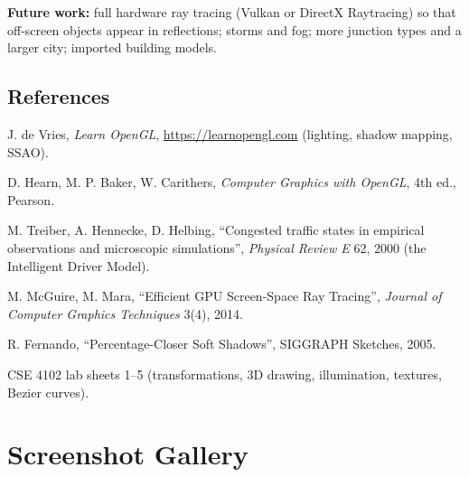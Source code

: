 \documentclass[11pt,a4paper]{article}
\begin{document}
\textbf{Future work:} full hardware ray tracing (Vulkan or DirectX Raytracing) so that off-screen objects appear in reflections; storms and fog; more junction types and a larger city; imported building models.

\subsection*{References}
\begin{enumerate}[label={[\arabic*]}]
  \item J. de Vries, \emph{Learn OpenGL}, \url{https://learnopengl.com} (lighting, shadow mapping, SSAO).
  \item D. Hearn, M. P. Baker, W. Carithers, \emph{Computer Graphics with OpenGL}, 4th ed., Pearson.
  \item M. Treiber, A. Hennecke, D. Helbing, ``Congested traffic states in empirical observations and microscopic simulations'', \emph{Physical Review E} 62, 2000 (the Intelligent Driver Model).
  \item M. McGuire, M. Mara, ``Efficient GPU Screen-Space Ray Tracing'', \emph{Journal of Computer Graphics Techniques} 3(4), 2014.
  \item R. Fernando, ``Percentage-Closer Soft Shadows'', SIGGRAPH Sketches, 2005.
  \item CSE 4102 lab sheets 1--5 (transformations, 3D drawing, illumination, textures, Bezier curves).
\end{enumerate}

\appendix
\section{Screenshot Gallery}
\end{document}
